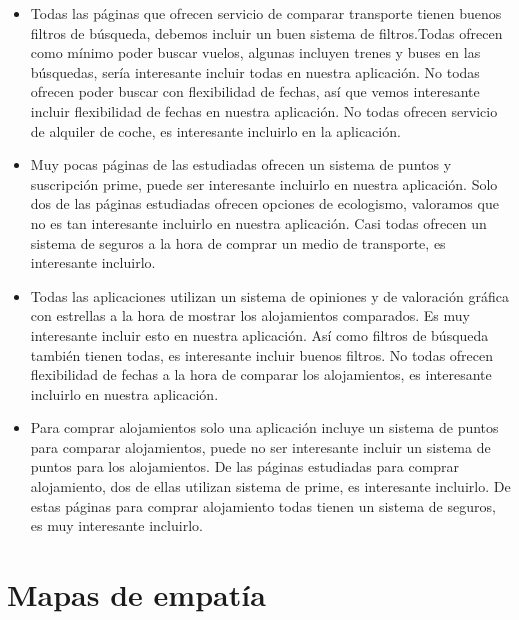\begin{itemize}
    \item Todas las páginas que ofrecen servicio de comparar transporte tienen buenos filtros de búsqueda, debemos incluir un buen sistema de filtros.Todas ofrecen como mínimo poder buscar vuelos, algunas incluyen trenes y buses en las búsquedas, sería interesante incluir todas en nuestra aplicación. No todas ofrecen poder buscar con flexibilidad de fechas, así que vemos interesante incluir flexibilidad de fechas en nuestra aplicación. No todas ofrecen servicio de alquiler de coche, es interesante incluirlo en la aplicación.
    \item Muy pocas páginas de las estudiadas ofrecen un sistema de puntos y suscripción prime, puede ser interesante incluirlo en nuestra aplicación. Solo dos de las páginas estudiadas ofrecen opciones de ecologismo, valoramos que no es tan interesante incluirlo en nuestra aplicación. Casi todas ofrecen un sistema de seguros a la hora de comprar un medio de transporte, es interesante incluirlo.
    \item Todas las aplicaciones utilizan un sistema de opiniones y de valoración gráfica con estrellas a la hora de mostrar los alojamientos comparados. Es muy interesante incluir esto en nuestra aplicación. Así como filtros de búsqueda también tienen todas, es interesante incluir buenos filtros. No todas ofrecen flexibilidad de fechas a la hora de comparar los alojamientos, es interesante incluirlo en nuestra aplicación.
    \item Para comprar alojamientos solo una aplicación incluye un sistema de puntos para comparar alojamientos, puede no ser interesante incluir un sistema de puntos para los alojamientos. De las páginas estudiadas para comprar alojamiento, dos de ellas utilizan sistema de prime, es interesante incluirlo. De estas páginas para comprar alojamiento todas tienen un sistema de seguros, es muy interesante incluirlo.
\end{itemize}

\section{Mapas de empatía}
